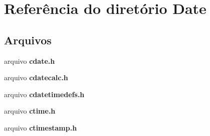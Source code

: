 \section{Referência do diretório Date}
\label{dir_8a5230ea30e565e15a4f2ccaf871f938}
\subsection*{Arquivos}
\begin{DoxyCompactItemize}
\item 
arquivo {\bf cdate.\+h}
\item 
arquivo {\bf cdatecalc.\+h}
\item 
arquivo {\bf cdatetimedefs.\+h}
\item 
arquivo {\bf ctime.\+h}
\item 
arquivo {\bf ctimestamp.\+h}
\end{DoxyCompactItemize}
